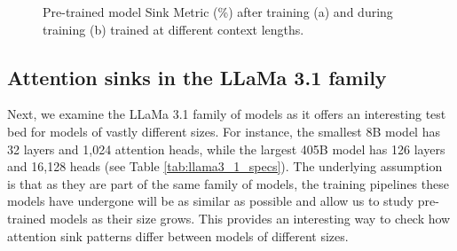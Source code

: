 \documentclass{article} %
\begin{document}
\begin{figure}[H]
    \vspace{-20pt}
    \centering
    \qquad
    \caption{Pre-trained model Sink Metric (\%) after training (a) and during training (b) trained at different context lengths.}%
    \label{fig:context-curves-main}%
    \vspace{-10pt}
\end{figure}


\subsection{Attention sinks in the LLaMa 3.1 family}
\label{sec:llama-depth}
Next, we examine the LLaMa 3.1 family of models as it offers an interesting test bed for models of vastly different sizes. For instance, the smallest 8B model has 32 layers and 1{\textnormal{,}}024 attention heads, while the largest 405B model has 126 layers and 16{\textnormal{,}}128 heads (see Table \ref{tab:llama3_1_specs}). The underlying assumption is that as they are part of the same family of models, the training pipelines these models have undergone will be as similar as possible and allow us to study pre-trained models as their size grows. This provides an interesting way to check how attention sink patterns differ between models of different sizes. 
\end{document}
